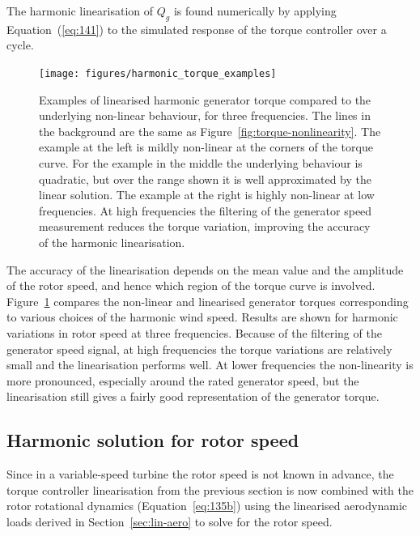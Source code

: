 \documentclass[a4paper,preprint]{elsarticle}
\begin{document}
The harmonic linearisation of $Q_g$ is found numerically by applying
Equation~(\ref{eq:141}) to the simulated response of the torque controller over
a cycle.

\begin{figure}
  \centering
  \texttt{[image: figures/harmonic\_torque\_examples]}
  \caption{Examples of linearised harmonic generator torque compared to the
    underlying non-linear behaviour, for three frequencies. The lines in the
    background are the same as Figure~\ref{fig:torque-nonlinearity}. The example
    at the left is mildly non-linear at the corners of the torque curve. For the
    example in the middle the underlying behaviour is quadratic, but over the
    range shown it is well approximated by the linear solution. The example at
    the right is highly non-linear at low frequencies. At high frequencies the
    filtering of the generator speed measurement reduces the torque variation,
    improving the accuracy of the harmonic linearisation.}
\label{fig:harmonic-generator-vs-speed}
\end{figure}

The accuracy of the linearisation depends on the mean value and the amplitude of
the rotor speed, and hence which region of the torque curve is involved.
Figure~\ref{fig:harmonic-generator-vs-speed} compares the non-linear and
linearised generator torques corresponding to various choices of the harmonic
wind speed. Results are shown for harmonic variations in rotor speed at three
frequencies. Because of the filtering of the generator speed signal, at high
frequencies the torque variations are relatively small and the linearisation
performs well. At lower frequencies the non-linearity is more pronounced,
especially around the rated generator speed, but the linearisation still gives a
fairly good representation of the generator torque.

\subsection{Harmonic solution for rotor speed}
\label{sec:harm-solut-gener}

Since in a variable-speed turbine the rotor speed is not known in advance, the
torque controller linearisation from the previous section is now combined with
the rotor rotational dynamics (Equation~\ref{eq:135b}) using the linearised
aerodynamic loads derived in Section~\ref{sec:lin-aero} to solve for the rotor
speed.
\end{document}
